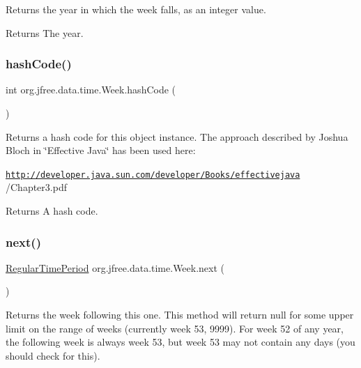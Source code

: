 Returns the year in which the week falls, as an integer value.

\begin{DoxyReturn}{Returns}
The year. 
\end{DoxyReturn}
\mbox{\label{classorg_1_1jfree_1_1data_1_1time_1_1_week_a9711eb24ca8c476e444c3e05d5ca3c15}} 
\subsubsection{\texorpdfstring{hash\+Code()}{hashCode()}}
{\footnotesize\ttfamily int org.\+jfree.\+data.\+time.\+Week.\+hash\+Code (\begin{DoxyParamCaption}{ }\end{DoxyParamCaption})}

Returns a hash code for this object instance. The approach described by Joshua Bloch in \char`\"{}\+Effective Java\char`\"{} has been used here\+: 

{\ttfamily \href{http://developer.java.sun.com/developer/Books/effectivejava}{\tt http\+://developer.\+java.\+sun.\+com/developer/\+Books/effectivejava} /\+Chapter3.pdf}

\begin{DoxyReturn}{Returns}
A hash code. 
\end{DoxyReturn}
\mbox{\label{classorg_1_1jfree_1_1data_1_1time_1_1_week_a5ef982a5aa1fd1e16ee6dd03aa2a57e8}} 
\subsubsection{\texorpdfstring{next()}{next()}}
{\footnotesize\ttfamily \mbox{\hyperlink{classorg_1_1jfree_1_1data_1_1time_1_1_regular_time_period}{Regular\+Time\+Period}} org.\+jfree.\+data.\+time.\+Week.\+next (\begin{DoxyParamCaption}{ }\end{DoxyParamCaption})}

Returns the week following this one. This method will return {\ttfamily null} for some upper limit on the range of weeks (currently week 53, 9999). For week 52 of any year, the following week is always week 53, but week 53 may not contain any days (you should check for this).

